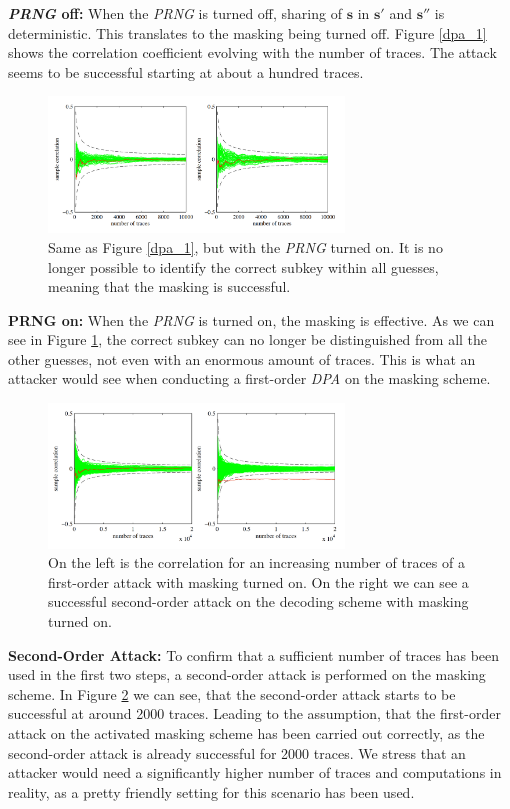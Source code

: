 \textbf{\textit{\acs{PRNG}} off:} When the \textit{\ac{PRNG}} is turned off, sharing of \(\textbf{s}\) in \(\textbf{s}'\) and \(\textbf{s}''\) is deterministic. This translates to the masking being turned off. Figure \ref{dpa_1} shows the correlation coefficient evolving with the number of traces. The attack seems to be successful starting at about a hundred traces.
\begin{figure}[H]
	\centering
	\includegraphics[width=0.7\textwidth]{dpa_2.png}
	\caption{Same as Figure \ref{dpa_1}, but with the \textit{\acs{PRNG}} turned on. It is no longer possible to identify the correct subkey within all guesses, meaning that the masking is successful. \cite{maskedRing}}
	\label{dpa_2}
\end{figure}

\textbf{\acs{PRNG} on:} When the \textit{\acs{PRNG}} is turned on, the masking is effective. As we can see in Figure \ref{dpa_2}, the correct subkey can no longer be distinguished from all the other guesses, not even with an enormous amount of traces. This is what an attacker would see when conducting a first-order \textit{\ac{DPA}} on the masking scheme.
\begin{figure}[H]
	\centering
	\includegraphics[width=0.7\textwidth]{dpa_3.png}
	\caption{On the left is the correlation for an increasing number of traces of a first-order attack with masking turned on. On the right we can see a successful second-order attack on the decoding scheme with masking turned on. \cite{maskedRing}}
	\label{dpa_3}
\end{figure}

\textbf{Second-Order Attack:} To confirm that a sufficient number of traces has been used in the first two steps, a second-order attack is performed on the masking scheme. In Figure \ref{dpa_3} we can see, that the second-order attack starts to be successful at around 2000 traces. Leading to the assumption, that the first-order attack on the activated masking scheme has been carried out correctly, as the second-order attack is already successful for 2000 traces. We stress that an attacker would need a significantly higher number of traces and computations in reality, as a pretty friendly setting for this scenario has been used.